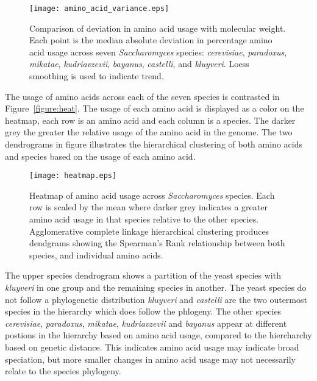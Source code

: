 \begin{figure}
  \centering
  \texttt{[image: amino\_acid\_variance.eps]}
  \caption[Comparison of deviation in amino acid usage with molecular weight]{Comparison of deviation in amino acid usage with molecular weight. Each point is the median absolute deviation in percentage amino acid usage across seven \emph{Saccharomyces} species: \emph{cerevisiae}, \emph{paradoxus}, \emph{mikatae}, \emph{kudriavzevii}, \emph{bayanus}, \emph{castelli}, and \emph{kluyveri}. Loess smoothing is used to indicate trend.}
  \label{figure:amino_acid_variance}
\end{figure}

The usage of amino acids across each of the seven species is contrasted in Figure~\vref{figure:heat}. The usage of each amino acid is displayed as a color on the heatmap, each row is an amino acid and each column is a species. The darker grey the greater the relative usage of the amino acid in the genome. The two dendrograms in figure illustrates the hierarchical clustering of both amino acids and species based on the usage of each amino acid.

\begin{figure}
  \centering
  \texttt{[image: heatmap.eps]}
  \caption[Heatmap of amino acid usage across \emph{Saccharomyces} species]{Heatmap of amino acid usage across \emph{Saccharomyces} species. Each row is scaled by the mean where darker grey indicates a greater amino acid usage in that species relative to the other species. Agglomerative complete linkage hierarchical clustering produces dendgrams showing the Spearman's Rank relationship between both species, and individual amino acids.}
  \label{figure:heat}
\end{figure}

The upper species dendrogram shows a partition of the yeast species with \emph{kluyveri} in one group and the remaining species in another. The yeast species do not follow a phylogenetic distribution \emph{kluyveri} and \emph{castelli} are the two outermost species in the hierarchy which does follow the phlogeny. The other species \emph{cerevisiae}, \emph{paradoxus}, \emph{mikatae}, \emph{kudriavzevii} and \emph{bayanus} appear at different postions in the hierarchy based on amino acid usage, compared to the hiercharchy based on genetic distance. This indicates amino acid usage may indicate broad speciation, but more smaller changes in amino acid usage may not necessarily relate to the species phylogeny.

